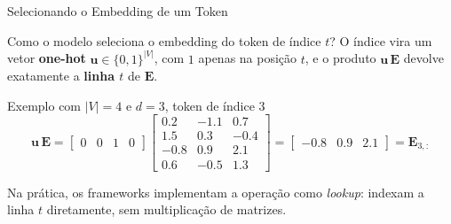 \documentclass[aspectratio=169,xcolor=dvipsnames]{beamer}
\begin{document}

\begin{frame}{Selecionando o Embedding de um Token}

Como o modelo seleciona o embedding do token de índice $t$? O índice vira um vetor \textbf{one-hot} $\mathbf{u} \in \{0,1\}^{|V|}$, com $1$ apenas na posição $t$, e o produto $\mathbf{u}\,\mathbf{E}$ devolve exatamente a \textbf{linha $t$} de $\mathbf{E}$.

\vspace{4pt}

\begin{exampleblock}{Exemplo com $|V| = 4$ e $d = 3$, token de índice $3$}
\[
\mathbf{u}\,\mathbf{E} =
\begin{bmatrix} 0 & 0 & 1 & 0 \end{bmatrix}
\begin{bmatrix}
0.2 & -1.1 & 0.7 \\
1.5 & 0.3 & -0.4 \\
-0.8 & 0.9 & 2.1 \\
0.6 & -0.5 & 1.3
\end{bmatrix}
=
\begin{bmatrix} -0.8 & 0.9 & 2.1 \end{bmatrix}
= \mathbf{E}_{3,:}
\]
\end{exampleblock}

\vspace{6pt}

Na prática, os frameworks implementam a operação como \textit{lookup}: indexam a linha $t$ diretamente, sem multiplicação de matrizes.

\end{frame}

\end{document}
